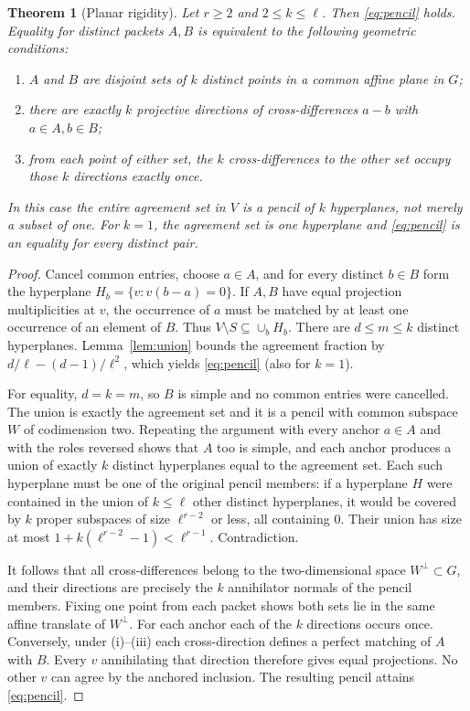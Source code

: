 \documentclass[11pt]{article}
\newtheorem{theorem}{Theorem}[section]
\theoremstyle{remark}\newtheorem{remark}[theorem]{Remark}
\begin{document}
\begin{theorem}[Planar rigidity]\label{thm:planar}
Let $r\ge2$ and $2\le k\le\ell$. Then \eqref{eq:pencil} holds. Equality for distinct packets $A,B$ is equivalent to the following geometric conditions:
\begin{enumerate}[label=(\roman*)]
\item $A$ and $B$ are disjoint sets of $k$ distinct points in a common affine plane in $G$;
\item there are exactly $k$ projective directions of cross-differences $a-b$ with $a\in A,b\in B$;
\item from each point of either set, the $k$ cross-differences to the other set occupy those $k$ directions exactly once.
\end{enumerate}
In this case the entire agreement set in $V$ is a pencil of $k$ hyperplanes, not merely a subset of one. For $k=1$, the agreement set is one hyperplane and \eqref{eq:pencil} is an equality for every distinct pair.
\end{theorem}
\begin{proof}
Cancel common entries, choose $a\in A$, and for every distinct $b\in B$ form the hyperplane $H_b=\{v:v(b-a)=0\}$. If $A,B$ have equal projection multiplicities at $v$, the occurrence of $a$ must be matched by at least one occurrence of an element of $B$. Thus $V\setminus S\subseteq\cup_b H_b$. There are $d\le m\le k$ distinct hyperplanes. Lemma~\ref{lem:union} bounds the agreement fraction by $d/\ell-(d-1)/\ell^2$, which yields \eqref{eq:pencil} (also for $k=1$).

For equality, $d=k=m$, so $B$ is simple and no common entries were cancelled. The union is exactly the agreement set and it is a pencil with common subspace $W$ of codimension two. Repeating the argument with every anchor $a\in A$ and with the roles reversed shows that $A$ too is simple, and each anchor produces a union of exactly $k$ distinct hyperplanes equal to the agreement set. Each such hyperplane must be one of the original pencil members: if a hyperplane $H$ were contained in the union of $k\le\ell$ other distinct hyperplanes, it would be covered by $k$ proper subspaces of size $\ell^{r-2}$ or less, all containing $0$. Their union has size at most $1+k(\ell^{r-2}-1)<\ell^{r-1}$. Contradiction.

It follows that all cross-differences belong to the two-dimensional space $W^\perp\subset G$, and their directions are precisely the $k$ annihilator normals of the pencil members. Fixing one point from each packet shows both sets lie in the same affine translate of $W^\perp$. For each anchor each of the $k$ directions occurs once. Conversely, under (i)--(iii) each cross-direction defines a perfect matching of $A$ with $B$. Every $v$ annihilating that direction therefore gives equal projections. No other $v$ can agree by the anchored inclusion. The resulting pencil attains \eqref{eq:pencil}.
\end{proof}
\end{document}
